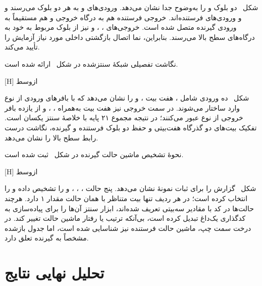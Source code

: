 شکل~ دو بلوک  و  را
به‌وضوح جدا نشان می‌دهد. ورودی‌های  و  به هر دو بلوک می‌رسند و
 و  ورودی‌های فرستنده‌اند. خروجی  فرستنده
هم به درگاه خروجی  و هم مستقیماً به ورودی 
گیرنده متصل شده است.
خروجی‌های ، ،  و
 نیز از بلوک مربوط به خود به درگاه‌های سطح بالا می‌رسند. بنابراین، نما
اتصال بازگشتی داخلی مورد نیاز آزمایش را تأیید می‌کند.

نگاشت تفصیلی شبکهٔ سنتزشده در
شکل~ ارائه شده است.

[H]
‌ازوسط

شکل~ ده ورودی شامل ، هفت بیت
،  و  را نشان می‌دهد که با بافرهای
ورودی از نوع  وارد ساختار می‌شوند. در سمت
خروجی نیز هفت بیت  به‌همراه
، ،  و  از یازده بافر
خروجی از نوع  عبور می‌کنند؛ در نتیجه مجموع
۲۱ پایه با خلاصهٔ سنتز یکسان است. تفکیک
بیت‌های دو گذرگاه هفت‌بیتی و حفظ دو بلوک فرستنده و گیرنده، نگاشت درست
رابط سطح بالا را
نشان می‌دهد.

نحوهٔ تشخیص ماشین حالت گیرنده در شکل~ ثبت شده است.

[H]
‌ازوسط

شکل~ گزارش  را برای ثبات
 نمونهٔ  نشان می‌دهد.  پنج حالت
، ، ،  و  را تشخیص داده و
 را  انتخاب کرده است؛ در هر ردیف تنها بیت متناظر با همان
حالت مقدار ۱ دارد. هرچند حالت‌ها در کد  با مقادیر سه‌بیتی تعریف شده‌اند، ابزار
سنتز آن‌ها را برای پیاده‌سازی به کدگذاری یک‌داغ تبدیل کرده
است، بی‌آنکه ترتیب یا رفتار ماشین
حالت تغییر کند. در درخت سمت چپ، ماشین حالت فرستنده نیز شناسایی شده است، اما جدول بازشده
مشخصاً به گیرنده تعلق دارد.


\section{تحلیل نهایی نتایج}

